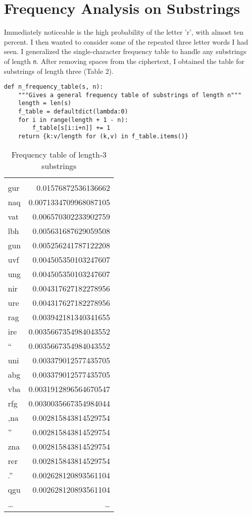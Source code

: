 \documentclass[11pt]{article}
\begin{document}
\section{Frequency Analysis on Substrings}
\label{sec-2}
Immediately noticeable is the high probability of the letter 'r', with
almost ten percent. I then wanted to consider some of the repeated
three letter words I had seen. I generalized the single-character
frequency table to handle any substrings of length \verb~n~. After removing
spaces from the ciphertext, I obtained the table for substrings of
length three (Table 2).

\begin{verbatim}
def n_frequency_table(s, n):
    """Gives a general frequency table of substrings of length n"""
    length = len(s)
    f_table = defaultdict(lambda:0)
    for i in range(length + 1 - n):
        f_table[s[i:i+n]] += 1
    return {k:v/length for (k,v) in f_table.items()}
\end{verbatim}

\begin{table}[htb]
\caption{Frequency table of length-3 substrings}
\centering
\begin{tabular}{lr}
 & \\
gur & 0.01576872536136662\\
naq & 0.0071334709968087105\\
vat & 0.006570302233902759\\
lbh & 0.005631687629059508\\
gun & 0.005256241787122208\\
uvf & 0.004505350103247607\\
ung & 0.004505350103247607\\
nir & 0.004317627182278956\\
ure & 0.004317627182278956\\
rag & 0.003942181340341655\\
ire & 0.0035667354984043552\\
\n\n“ & 0.0035667354984043552\\
uni & 0.003379012577435705\\
abg & 0.003379012577435705\\
vba & 0.0031912896564670547\\
rfg & 0.0030035667354984044\\
,na & 0.002815843814529754\\
”\n\n & 0.002815843814529754\\
zna & 0.002815843814529754\\
rer & 0.002815843814529754\\
.”\n & 0.002628120893561104\\
qgu & 0.002628120893561104\\
\ldots{} & \ldots{}\\
\end{tabular}
\end{table}
\end{document}

